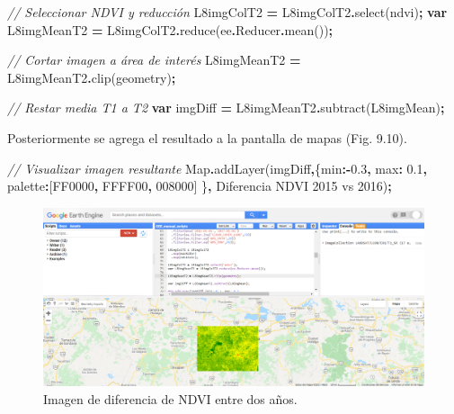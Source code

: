 \documentclass[
  12pt,
  letterpaper,
  twoside]{book}
\newenvironment{Shaded}{\begin{snugshade}}{\end{snugshade}}
\newcommand{\AttributeTok}[1]{\textcolor[rgb]{0.77,0.63,0.00}{#1}}
\newcommand{\BuiltInTok}[1]{#1}
\newcommand{\CommentTok}[1]{\textcolor[rgb]{0.56,0.35,0.01}{\textit{#1}}}
\newcommand{\DataTypeTok}[1]{\textcolor[rgb]{0.13,0.29,0.53}{#1}}
\newcommand{\FloatTok}[1]{\textcolor[rgb]{0.00,0.00,0.81}{#1}}
\newcommand{\FunctionTok}[1]{\textcolor[rgb]{0.00,0.00,0.00}{#1}}
\newcommand{\KeywordTok}[1]{\textcolor[rgb]{0.13,0.29,0.53}{\textbf{#1}}}
\newcommand{\NormalTok}[1]{#1}
\newcommand{\OperatorTok}[1]{\textcolor[rgb]{0.81,0.36,0.00}{\textbf{#1}}}
\newcommand{\StringTok}[1]{\textcolor[rgb]{0.31,0.60,0.02}{#1}}
\begin{document}
\begin{Shaded}
\begin{Highlighting}[]
\CommentTok{// Seleccionar NDVI y reducción}
\NormalTok{L8imgColT2 }\OperatorTok{=}\NormalTok{ L8imgColT2}\OperatorTok{.}\FunctionTok{select}\NormalTok{(}\StringTok{\textquotesingle{}ndvi\textquotesingle{}}\NormalTok{)}\OperatorTok{;}
\KeywordTok{var}\NormalTok{ L8imgMeanT2 }\OperatorTok{=}\NormalTok{ L8imgColT2}\OperatorTok{.}\FunctionTok{reduce}\NormalTok{(ee}\OperatorTok{.}\AttributeTok{Reducer}\OperatorTok{.}\FunctionTok{mean}\NormalTok{())}\OperatorTok{;}

\CommentTok{// Cortar imagen a área de interés}
\NormalTok{L8imgMeanT2 }\OperatorTok{=}\NormalTok{ L8imgMeanT2}\OperatorTok{.}\FunctionTok{clip}\NormalTok{(geometry)}\OperatorTok{;}

\CommentTok{// Restar media T1 a T2}
\KeywordTok{var}\NormalTok{ imgDiff }\OperatorTok{=}\NormalTok{ L8imgMeanT2}\OperatorTok{.}\FunctionTok{subtract}\NormalTok{(L8imgMean)}\OperatorTok{;}  
\end{Highlighting}
\end{Shaded}

Posteriormente se agrega el resultado a la pantalla de mapas (Fig. 9.10).

\begin{Shaded}
\begin{Highlighting}[]
\CommentTok{// Visualizar imagen resultante}
\BuiltInTok{Map}\OperatorTok{.}\FunctionTok{addLayer}\NormalTok{(imgDiff}\OperatorTok{,}\NormalTok{\{}\DataTypeTok{min}\OperatorTok{:{-}}\FloatTok{0.3}\OperatorTok{,} \DataTypeTok{max}\OperatorTok{:} \FloatTok{0.1}\OperatorTok{,} 
  \DataTypeTok{palette}\OperatorTok{:}\NormalTok{[}\StringTok{\textquotesingle{}FF0000\textquotesingle{}}\OperatorTok{,} \StringTok{\textquotesingle{}FFFF00\textquotesingle{}}\OperatorTok{,} \StringTok{\textquotesingle{}008000\textquotesingle{}}\NormalTok{] \}}\OperatorTok{,} 
  \StringTok{\textquotesingle{}Diferencia NDVI 2015 vs 2016\textquotesingle{}}\NormalTok{)}\OperatorTok{;}
\end{Highlighting}
\end{Shaded}

\begin{figure}[btp]

{\centering \includegraphics[width=1\linewidth]{Img/imDifNDVI} 

}

\caption{Imagen de diferencia de NDVI entre dos años.}\label{fig:unnamed-chunk-169}
\end{figure}
\end{document}
